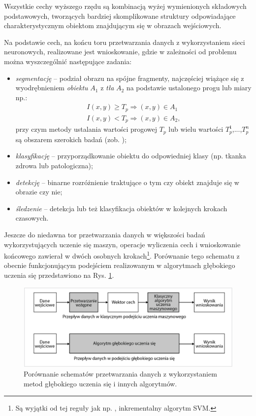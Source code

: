 Wszystkie cechy wyższego rzędu są kombinacją wyżej wymienionych składowych podstawowych, tworzących bardziej skomplikowane struktury odpowiadające charakterystycznym obiektom znajdującym się w obrazach wejściowych. 

Na podstawie cech, na końcu toru przetwarzania danych z wykorzystaniem sieci neuronowych, realizowane jest wnioskowanie, gdzie w zależności od problemu można wyszczególnić następujące zadania:
\begin{itemize}[noitemsep,nolistsep]
	\item \textit{segmentację} -- podział obrazu na spójne fragmenty, najczęściej wiążące się z wyodrębnieniem \textit{obiektu} $A_1$ z \textit{tła} $A_2$ na podstawie ustalonego progu lub miary np.:
	\begin{equation*}
	\begin{aligned}
	I(x,y) \geq T_p \Rightarrow (x,y) \in A_1 \\
	I(x,y) < T_p \Rightarrow (x,y) \in A_2,
	\end{aligned}
	\end{equation*} 
	przy czym metody ustalania wartości progowej $T_p$ lub wielu wartości {$T_p^1$,...,$T_p^n$} są obszarem szerokich badań (zob. \cite{DBLP:journals/corr/abs-1005-4020});
	\item \textit{klasyfikację} -- przyporządkowanie obiektu do odpowiedniej klasy (np. tkanka zdrowa lub patologiczna);
	\item \textit{detekcję} -- binarne rozróżnienie traktujące o tym czy obiekt znajduje się w obrazie czy nie;
	\item \textit{śledzenie} -- detekcja lub też klasyfikacja obiektów w kolejnych krokach czasowych.
\end{itemize} 

Jeszcze do niedawna tor przetwarzania danych w większości badań wykorzystujących uczenie się maszyn, operacje wyliczenia cech i wnioskowanie końcowego zawierał w dwóch osobnych krokach\footnote{Są wyjątki od tej reguły jak np. \cite{10.1007/978-3-319-58667-0_7}, inkrementalny algorytm SVM.}. Porównanie tego schematu z obecnie funkcjonującym podejściem realizowanym w algorytmach głębokiego uczenia się przedstawiono na Rys. \ref{DLworkflow}.
\begin{figure}[h!]
	\centering
	\includegraphics[width=1\textwidth]{figures/DLworkflow.png}
	\caption{Porównanie schematów przetwarzania danych z wykorzystaniem metod głębokiego uczenia się i innych algorytmów.}
	\label{DLworkflow}
\end{figure}


